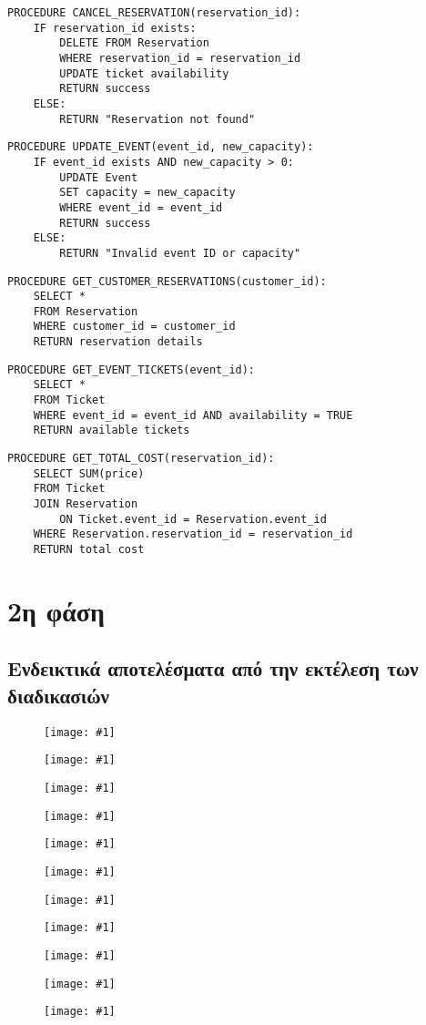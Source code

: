 \documentclass[a4paper, 11pt]{article}
\newcommand{\includeimage}[2]{
    \begin{figure}[H]
        \centering
        \texttt{[image: \#1]}
        \if\relax\detokenize{#2}\relax
        \else
            \caption{#2}
        \fi
    \end{figure}
}
\begin{document}
\begin{verbatim}
PROCEDURE CANCEL_RESERVATION(reservation_id):
    IF reservation_id exists:
        DELETE FROM Reservation 
        WHERE reservation_id = reservation_id
        UPDATE ticket availability
        RETURN success
    ELSE:
        RETURN "Reservation not found"
\end{verbatim}
\begin{verbatim}
PROCEDURE UPDATE_EVENT(event_id, new_capacity):
    IF event_id exists AND new_capacity > 0:
        UPDATE Event 
        SET capacity = new_capacity 
        WHERE event_id = event_id
        RETURN success
    ELSE:
        RETURN "Invalid event ID or capacity"
\end{verbatim}      
\begin{verbatim}
PROCEDURE GET_CUSTOMER_RESERVATIONS(customer_id):
    SELECT * 
    FROM Reservation 
    WHERE customer_id = customer_id
    RETURN reservation details
\end{verbatim}  
\begin{verbatim}
PROCEDURE GET_EVENT_TICKETS(event_id):
    SELECT * 
    FROM Ticket 
    WHERE event_id = event_id AND availability = TRUE
    RETURN available tickets
\end{verbatim} 
\begin{verbatim}
PROCEDURE GET_TOTAL_COST(reservation_id):
    SELECT SUM(price) 
    FROM Ticket 
    JOIN Reservation 
        ON Ticket.event_id = Reservation.event_id
    WHERE Reservation.reservation_id = reservation_id
    RETURN total cost
\end{verbatim}
\section*{2η φάση}
\subsection*{Ενδεικτικά αποτελέσματα από την εκτέλεση των διαδικασιών}
\includeimage{images/add_customer_try.png}{}
\includeimage{images/add_customer_res.png}{}
\includeimage{images/add_event_try.png}{}
\includeimage{images/add_event_res.png}{}
\includeimage{images/book_tickets_try.png}{}
\includeimage{images/book_tickets_res.png}{}
\includeimage{images/search_available_seats.png}{}
\includeimage{images/view_profits.png}{}
\includeimage{images/active_reservations.png}{}
\includeimage{images/most_popular_event.png}{}
\includeimage{images/event_highest_profit.png}{}
\end{document}
